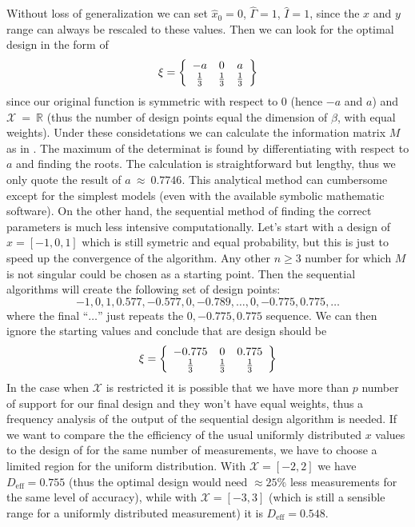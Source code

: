 \documentclass[12pt]{iopart}
\begin{document}
Without loss of generalization we can set $\hat x_0 = 0$, $\hat \Gamma = 1$, $\hat I = 1$, since the $x$ and $y$ range can always be rescaled to these values. Then we can look for the optimal design in the form of
\begin{equation}
\xi = \left\{
  \begin{array}{c c c}
    -a & 0 & a\\
    \frac{1}{3} & \frac{1}{3} & \frac{1}{3}\\
  \end{array} \right \}
\end{equation}
since our original function is symmetric with respect to 0 (hence $-a$ and $a$) and $\mathcal{X}~=~\mathbb{R}$ (thus the number of design points equal the dimension of $\beta$, with equal weights). Under these considetations we can calculate the information matrix $M$ as in . The maximum of the determinat is found by differentiating with respect to $a$ and finding the roots. The calculation is straightforward but lengthy, thus we only quote the result of $a~\approx~0.7746$. This analytical method can cumbersome except for the simplest models (even with the available symbolic mathematic software). On the other hand, the sequential method of finding the correct parameters is much less intensive computationally. Let's start with a design of $x = [-1, 0, 1]$ which is still symetric and equal probability, but this is just to speed up the convergence of the algorithm. Any other $n \geq 3$ number for which $M$ is not singular could be chosen as a starting point. Then the sequential algorithms will create the following set of design points:
\begin{equation}
    -1, 0, 1, 0.577, -0.577, 0, -0.789,\ldots,0,-0.775,0.775,\ldots
\end{equation}
where the final ``$\ldots$'' just repeats the $0,-0.775,0.775$ sequence. We can then ignore the starting values and conclude that are design should be
\begin{equation}
\xi = \left\{
  \begin{array}{c c c}
    -0.775 & 0 & 0.775\\
    \frac{1}{3} & \frac{1}{3} & \frac{1}{3}\\
  \end{array} \right \}
\label{eq:lorentzxi1}
\end{equation}
In the case when $\mathcal{X}$ is restricted it is possible that we have more than $p$ number of support for our final design and they won't have equal weights, thus a frequency analysis of the output of the sequential design algorithm is needed.
If we want to compare the the efficiency of the usual uniformly distributed $x$ values to the design of  for the same number of measurements, we have to choose a limited region for the uniform distribution. With $\mathcal{X} = [-2, 2]$ we have $D_\mathrm{eff} = 0.755$ (thus the optimal design would need $\approx 25\%$ less measurements for the same level of accuracy), while with $\mathcal{X} =[-3, 3]$ (which is still a sensible range for a uniformly distributed measurement) it is $D_\mathrm{eff} = 0.548$.
\end{document}
